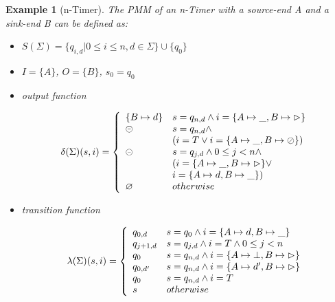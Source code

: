 \documentclass[conference, a4paper]{IEEEtran}
\newtheorem{example}{Example}
\newcommand{\rblock}[0]{\circleddash}
\newcommand{\rread}[0]{\rhd}
\newcommand{\rnoread}[0]{\oslash}
\newcommand{\rempty}[0]{\varnothing}
\begin{document}
\begin{example}[n-Timer]
  The PMM of an n-Timer with a source-end A and a sink-end B can be defined as:
  \begin{itemize}
    \item[-] $S(\Sigma)=\{q_{i,d}|0\leq i\leq n, d\in \Sigma\}\cup\{q_0\}$
    \item[-] $I=\{A\}$, $O=\{B\}$, $s_0=q_0$
    \item[-] output function
      \begin{small}
        \begin{displaymath}
          \delta(\Sigma)(s,i)=\left\{
          \begin{array}[ht]{ll}
            \{B\mapsto d\} & s=q_{n,d}\land i=\{A\mapsto \_,B\mapsto \rread\}\\
            \rblock & s=q_{n,d}\land \\
            & (i=T\lor i=\{A\mapsto \_,B\mapsto \rnoread\}) \\
            \rblock & s=q_{j,d}\land 0 \leq j < n\land \\
            & (i=\{A\mapsto \_,B\mapsto \rread\}\lor \\
            & i=\{A\mapsto d,B\mapsto \_\})\\
            \rempty & otherwise\\
          \end{array}
          \right.
        \end{displaymath} 
      \end{small}
    \item[-] transition function
      \begin{small}
        \begin{displaymath}
          \lambda(\Sigma)(s,i)=\left\{
          \begin{array}[ht]{ll}
            q_{0,d} & s=q_0 \land i=\{A\mapsto d,B\mapsto \_\} \\
            q_{j+1,d} & s=q_{j,d}\land i=T\land0 \leq j < n\\
            q_0 & s=q_{n,d}\land i=\{A\mapsto \bot,B\mapsto \rread\} \\
            q_{0,d'} & s=q_{n,d}\land i=\{A\mapsto d',B\mapsto \rread\} \\
            q_0 & s=q_{n,d} \land i=T \\
            s & otherwise \\
          \end{array}
          \right.
        \end{displaymath}
      \end{small}
  \end{itemize}
\end{example}
\end{document}
